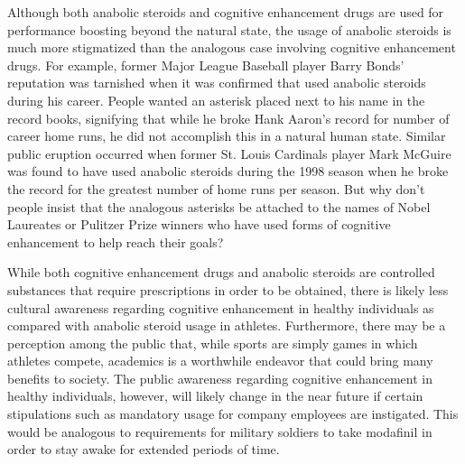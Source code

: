 Although both anabolic steroids and cognitive enhancement drugs are used for performance boosting beyond the natural state, the usage of anabolic steroids is much more stigmatized than the analogous case involving cognitive enhancement drugs. For example, former Major League Baseball player Barry Bonds' reputation was tarnished when it was confirmed that used anabolic steroids during his career. People wanted an asterisk placed next to his name in the record books, signifying that while he broke Hank Aaron's record for number of career home runs, he did not accomplish this in a natural human state.  Similar public eruption occurred when former St. Louis Cardinals player Mark McGuire was found to have used anabolic steroids during the 1998 season when he broke the record for the greatest number of home runs per season. But why don't people insist that the analogous asterisks be attached to the names of Nobel Laureates or Pulitzer Prize winners who have used forms of cognitive enhancement to help reach their goals?
	
While both cognitive enhancement drugs and anabolic steroids are controlled substances that require prescriptions in order to be obtained, there is likely less cultural awareness regarding cognitive enhancement in healthy individuals as compared with anabolic steroid usage in athletes. Furthermore, there may be a perception among the public that, while sports are simply games in which athletes compete, academics is a worthwhile endeavor that could bring many benefits to society. The public awareness regarding cognitive enhancement in healthy individuals, however, will likely change in the near future if certain stipulations such as mandatory usage for company employees are instigated. This would be analogous to requirements for military soldiers to take modafinil in order to stay awake for extended periods of time.
